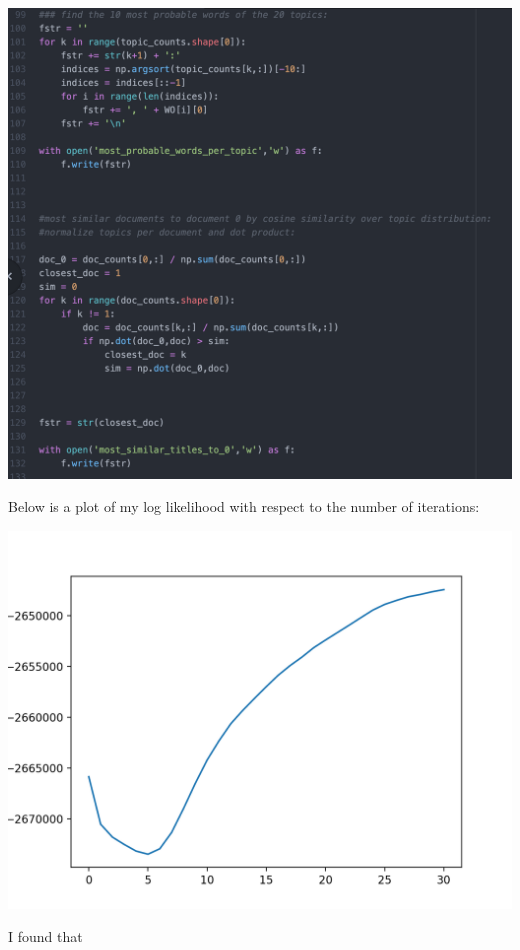 \documentclass[11pt]{article}
\theoremstyle{definition}
\begin{document}
\begin{enumerate}
\begin{center}
\includegraphics[scale=0.4]{figures/LDA}
\end{center}

Below is a plot of my log likelihood with respect to the number of iterations:

\begin{center}
\includegraphics[scale=0.5]{figures/plot_1.png}
\end{center}

I found that 

\end{enumerate}
\end{document}
